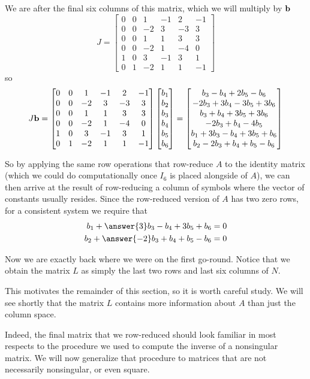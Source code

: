 \documentclass{ximera}
\begin{document}
\begin{example}[Redux]
  We are after the final six columns of this matrix, which we will multiply by $\mathbf{b}$
  \[
    J=
    \begin{bmatrix}
      0 & 0 & 1 & -1 & 2 & -1 \\
      0 & 0 & -2 & 3 & -3 & 3 \\
      0 & 0 & 1 & 1 & 3 & 3 \\
      0 & 0 & -2 & 1 & -4 & 0 \\
      1 & 0 & 3 & -1 & 3 & 1 \\
      0 & 1 & -2 & 1 & 1 & -1
    \end{bmatrix}
  \]
  so
  \[
    J\mathbf{b}=
    \begin{bmatrix}
      0 & 0 & 1 & -1 & 2 & -1 \\
      0 & 0 & -2 & 3 & -3 & 3 \\
      0 & 0 & 1 & 1 & 3 & 3 \\
      0 & 0 & -2 & 1 & -4 & 0 \\
      1 & 0 & 3 & -1 & 3 & 1 \\
      0 & 1 & -2 & 1 & 1 & -1
    \end{bmatrix}
    \begin{bmatrix}b_1\\b_2\\b_3\\b_4\\b_5\\b_6\end{bmatrix}
    =
    \begin{bmatrix}
      b_3 - b_4 + 2 b_5 - b_6\\
      -2 b_3 + 3 b_4 - 3 b_5 + 3 b_6\\
      b_3 + b_4 + 3 b_5 + 3 b_6\\
      -2 b_3 + b_4 - 4 b_5\\
      b_1 + 3 b_3 - b_4 + 3 b_5 + b_6\\
      b_2 - 2 b_3 + b_4 + b_5 - b_6\\
    \end{bmatrix}
  \]

  So by applying the same row operations that row-reduce $A$ to the
  identity matrix (which we could do computationally once $I_6$ is
  placed alongside of $A$), we can then arrive at the result of
  row-reducing a column of symbols where the vector of constants
  usually resides.  Since the row-reduced version of $A$ has two zero
  rows, for a consistent system we require that
  \begin{align*}
    b_1 + \answer{3} b_3 - b_4 + 3 b_5 + b_6 & = 0\\
    b_2 + \answer{-2} b_3 + b_4 + b_5 - b_6 & = 0
  \end{align*}

  Now we are exactly back where we were on the first go-round.  Notice
  that we obtain the matrix $L$ as simply the last two rows and last
  six columns of $N$.
\end{example}

This motivates the remainder of this section, so it is worth careful
study.  We will see shortly that the matrix $L$ contains more
information about $A$ than just the column space.

Indeed, the final matrix that we row-reduced should look familiar in
most respects to the procedure we used to compute the inverse of a
nonsingular matrix.  We will now generalize that procedure to matrices
that are not necessarily nonsingular, or even square.
\end{document}
